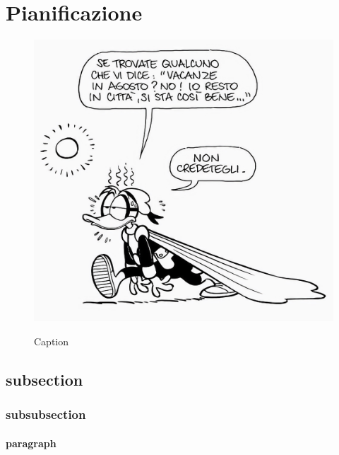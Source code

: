 \section{Pianificazione}
\begin{figure}[H]
    \centering
    \includegraphics[alt={Testo alternativo dell'immagine}, width=0.5\columnwidth]{img/pk_estate.jpeg}
    \caption{Caption}
    \label{fig:pk_estate_2}
\end{figure}
\lipsum[1]

\subsection{subsection}
\lipsum[1]

\subsubsection{subsubsection}
\lipsum[1]

\paragraph{paragraph}
\lipsum[1]

\newpage